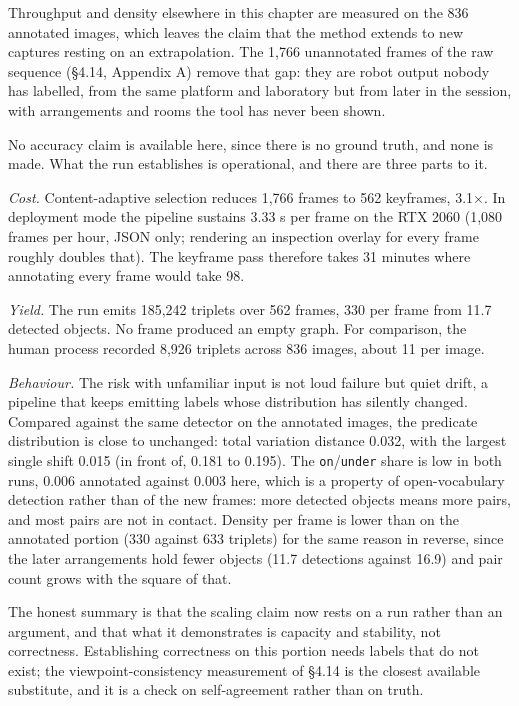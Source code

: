 Throughput and density elsewhere in this chapter are measured on the 836 annotated images, which leaves the claim that the method extends to new captures resting on an extrapolation. The 1,766 unannotated frames of the raw sequence (\S4.14, Appendix A) remove that gap: they are robot output nobody has labelled, from the same platform and laboratory but from later in the session, with arrangements and rooms the tool has never been shown.

No accuracy claim is available here, since there is no ground truth, and none is made. What the run establishes is operational, and there are three parts to it.

\textit{Cost.} Content-adaptive selection reduces 1,766 frames to 562 keyframes, 3.1$\times$. In deployment mode the pipeline sustains 3.33 s per frame on the RTX 2060 (1,080 frames per hour, JSON only; rendering an inspection overlay for every frame roughly doubles that). The keyframe pass therefore takes 31 minutes where annotating every frame would take 98.

\textit{Yield.} The run emits 185,242 triplets over 562 frames, 330 per frame from 11.7 detected objects. No frame produced an empty graph. For comparison, the human process recorded 8,926 triplets across 836 images, about 11 per image.

\textit{Behaviour.} The risk with unfamiliar input is not loud failure but quiet drift, a pipeline that keeps emitting labels whose distribution has silently changed. Compared against the same detector on the annotated images, the predicate distribution is close to unchanged: total variation distance 0.032, with the largest single shift 0.015 (in front of, 0.181 to 0.195). The \texttt{on}/\texttt{under} share is low in both runs, 0.006 annotated against 0.003 here, which is a property of open-vocabulary detection rather than of the new frames: more detected objects means more pairs, and most pairs are not in contact. Density per frame is lower than on the annotated portion (330 against 633 triplets) for the same reason in reverse, since the later arrangements hold fewer objects (11.7 detections against 16.9) and pair count grows with the square of that.

The honest summary is that the scaling claim now rests on a run rather than an argument, and that what it demonstrates is capacity and stability, not correctness. Establishing correctness on this portion needs labels that do not exist; the viewpoint-consistency measurement of \S4.14 is the closest available substitute, and it is a check on self-agreement rather than on truth.